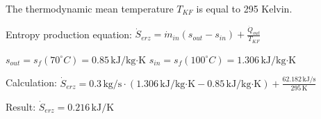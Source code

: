 The thermodynamic mean temperature \( T_{KF} \) is equal to 295 Kelvin.  

Entropy production equation:  
\( \dot{S}_{erz} = \dot{m}_{in} (s_{out} - s_{in}) + \frac{\dot{Q}_{out}}{T_{KF}} \)  

\( s_{out} = s_f (70^\circ C) = 0.85 \, \text{kJ/kg·K} \)  
\( s_{in} = s_f (100^\circ C) = 1.306 \, \text{kJ/kg·K} \)  

Calculation:  
\( \dot{S}_{erz} = 0.3 \, \text{kg/s} \cdot (1.306 \, \text{kJ/kg·K} - 0.85 \, \text{kJ/kg·K}) + \frac{62.182 \, \text{kJ/s}}{295 \, \text{K}} \)  

Result:  
\( \dot{S}_{erz} = 0.216 \, \text{kJ/K} \)